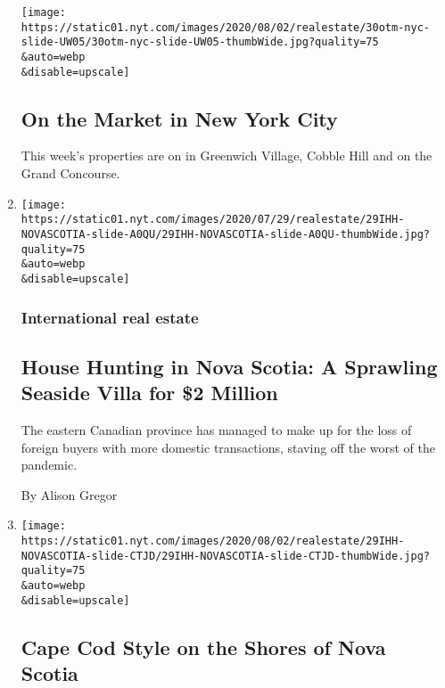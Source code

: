 \begin{enumerate}
  \texttt{[image: https://static01.nyt.com/images/2020/08/02/realestate/30otm-nyc-slide-UW05/30otm-nyc-slide-UW05-thumbWide.jpg?quality=75\\\&auto=webp\\\&disable=upscale]}

  \hypertarget{on-the-market-in-new-york-city}{%
  \subsection{On the Market in New York
  City}\label{on-the-market-in-new-york-city}}

  This week's properties are on in Greenwich Village, Cobble Hill and on
  the Grand Concourse.
\item
  \href{/2020/07/29/realestate/house-hunting-in-nova-scotia-a-sprawling-seaside-villa-for-2-million.html}{}

  \texttt{[image: https://static01.nyt.com/images/2020/07/29/realestate/29IHH-NOVASCOTIA-slide-A0QU/29IHH-NOVASCOTIA-slide-A0QU-thumbWide.jpg?quality=75\\\&auto=webp\\\&disable=upscale]}

  \hypertarget{international-real-estate}{%
  \subsubsection{International real
  estate}\label{international-real-estate}}

  \hypertarget{house-hunting-in-nova-scotia-a-sprawling-seaside-villa-for-2-million}{%
  \subsection{House Hunting in Nova Scotia: A Sprawling Seaside Villa
  for \$2
  Million}\label{house-hunting-in-nova-scotia-a-sprawling-seaside-villa-for-2-million}}

  The eastern Canadian province has managed to make up for the loss of
  foreign buyers with more domestic transactions, staving off the worst
  of the pandemic.

  By Alison Gregor
\item
  \href{/slideshow/2020/07/29/realestate/cape-cod-style-on-the-shores-of-nova-scotia.html}{}

  \texttt{[image: https://static01.nyt.com/images/2020/08/02/realestate/29IHH-NOVASCOTIA-slide-CTJD/29IHH-NOVASCOTIA-slide-CTJD-thumbWide.jpg?quality=75\\\&auto=webp\\\&disable=upscale]}

  \hypertarget{cape-cod-style-on-the-shores-of-nova-scotia}{%
  \subsection{Cape Cod Style on the Shores of Nova
  Scotia}\label{cape-cod-style-on-the-shores-of-nova-scotia}}


\end{enumerate}
